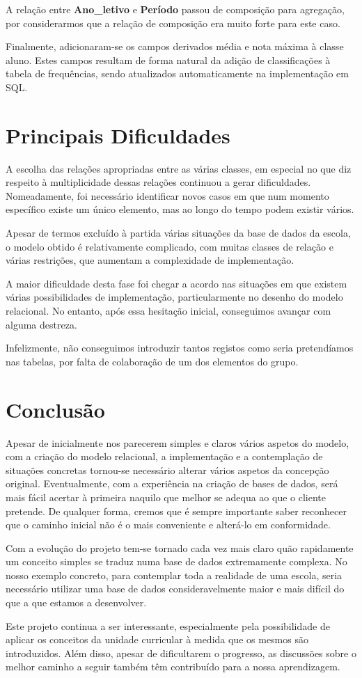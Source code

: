 \documentclass[12pt,a4paper,reqno]{report}
\numberwithin{figure}{section}
\numberwithin{equation}{section}
\begin{document}
A relação entre \textbf{Ano\_letivo} e \textbf{Período} passou de composição para agregação, por considerarmos que a relação de composição era muito forte para este caso.

Finalmente, adicionaram-se os campos derivados média e nota máxima à classe aluno. Estes campos resultam de forma natural da adição de classificações à tabela de frequências, sendo atualizados automaticamente na implementação em SQL.

\chapter{Principais Dificuldades}

A escolha das relações apropriadas entre as várias classes, em especial no que diz respeito à multiplicidade dessas relações continuou a gerar dificuldades. Nomeadamente, foi necessário identificar novos casos em que num momento específico existe um único elemento, mas ao longo do tempo podem existir vários.

Apesar de termos excluído à partida várias situações da base de dados da escola, o modelo obtido é relativamente complicado, com muitas classes de relação e várias restrições, que aumentam a complexidade de implementação.

A maior dificuldade desta fase foi chegar a acordo nas situações em que existem várias possibilidades de implementação, particularmente no desenho do modelo relacional. No entanto, após essa hesitação inicial, conseguimos avançar com alguma destreza.

Infelizmente, não conseguimos introduzir tantos registos como seria pretendíamos nas tabelas, por falta de colaboração de um dos elementos do grupo.

\chapter{Conclusão}

Apesar de inicialmente nos parecerem simples e claros vários aspetos do modelo, com a criação do modelo relacional, a implementação e a contemplação de situações concretas tornou-se necessário alterar vários aspetos da concepção original. Eventualmente, com a experiência na criação de bases de dados, será mais fácil acertar à primeira naquilo que melhor se adequa ao que o cliente pretende. De qualquer forma, cremos que é sempre importante saber reconhecer que o caminho inicial não é o mais conveniente e alterá-lo em conformidade.

Com a evolução do projeto tem-se tornado cada vez mais claro quão rapidamente um conceito simples se traduz numa base de dados extremamente complexa. No nosso exemplo concreto, para contemplar toda a realidade de uma escola, seria necessário utilizar uma base de dados consideravelmente maior e mais difícil do que a que estamos a desenvolver.

Este projeto continua a ser interessante, especialmente pela possibilidade de aplicar os conceitos da unidade curricular à medida que os mesmos são introduzidos. Além disso, apesar de dificultarem o progresso, as discussões sobre o melhor caminho a seguir também têm contribuído para a nossa aprendizagem.
\end{document}
